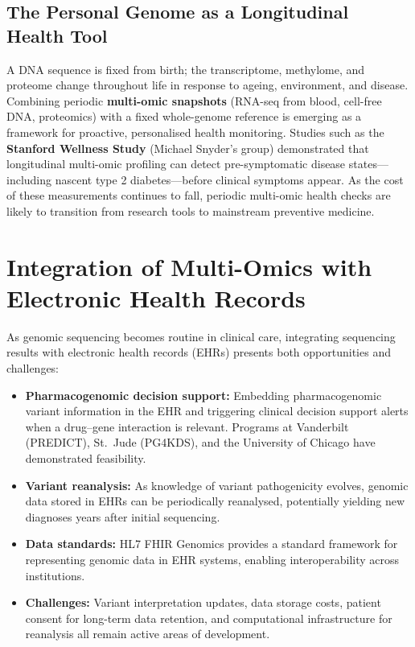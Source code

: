 \subsection{The Personal Genome as a Longitudinal Health Tool}
\label{subsec:demo:longitudinal}

A DNA sequence is fixed from birth; the transcriptome, methylome, and proteome change throughout life in response to ageing, environment, and disease. Combining periodic \textbf{multi-omic snapshots} (RNA-seq from blood, cell-free DNA, proteomics) with a fixed whole-genome reference is emerging as a framework for proactive, personalised health monitoring. Studies such as the \textbf{Stanford Wellness Study} (Michael Snyder's group) demonstrated that longitudinal multi-omic profiling can detect pre-symptomatic disease states---including nascent type 2 diabetes---before clinical symptoms appear. As the cost of these measurements continues to fall, periodic multi-omic health checks are likely to transition from research tools to mainstream preventive medicine.

\section{Integration of Multi-Omics with Electronic Health Records}
\label{sec:emerging:ehr-integration}

As genomic sequencing becomes routine in clinical care, integrating sequencing results with electronic health records (EHRs) presents both opportunities and challenges:

\begin{itemize}[itemsep=3pt]
  \item \textbf{Pharmacogenomic decision support:} Embedding pharmacogenomic variant information in the EHR and triggering clinical decision support alerts when a drug--gene interaction is relevant. Programs at Vanderbilt (PREDICT), St.\ Jude (PG4KDS), and the University of Chicago have demonstrated feasibility.
  \item \textbf{Variant reanalysis:} As knowledge of variant pathogenicity evolves, genomic data stored in EHRs can be periodically reanalysed, potentially yielding new diagnoses years after initial sequencing.
  \item \textbf{Data standards:} HL7 FHIR Genomics provides a standard framework for representing genomic data in EHR systems, enabling interoperability across institutions.
  \item \textbf{Challenges:} Variant interpretation updates, data storage costs, patient consent for long-term data retention, and computational infrastructure for reanalysis all remain active areas of development.
\end{itemize}


